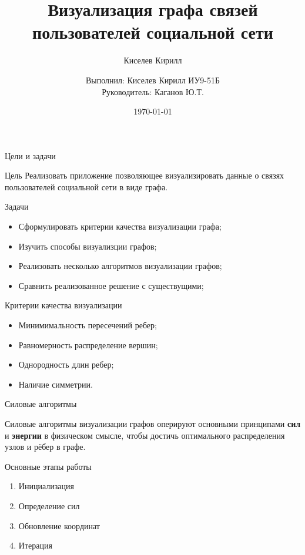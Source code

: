 \documentclass{beamer}
\title{Визуализация графа связей пользователей социальной сети}
\date{\today}
\author{Киселев Кирилл}
\author[me]{Выполнил: Киселев Кирилл ИУ9-51Б\\[1mm]Руководитель: Каганов Ю.Т.}
\begin{document}
\maketitle

\begin{frame}{Цели и задачи}
	\begin{alertblock}{Цель}
		Реализовать приложение позволяющее визуализировать данные о связях пользователей социальной сети в виде графа.
	\end{alertblock}
	\begin{alertblock}{Задачи}

		\begin{itemize}
			\item Сформулировать критерии качества визуализации графа;
			\item Изучить способы визуализции графов;
			\item Реализовать несколько алгоритмов визуализации графов;
			\item Сравнить реализованное решение с существущими;
		\end{itemize}
	\end{alertblock}
\end{frame}

\begin{frame}{Критерии качества визуализации}

	\begin{itemize}
		\item Минимимальность пересечений ребер;
		\item Равномерность распределение вершин;
		\item Однородность длин ребер;
		\item Наличие симметрии.
	\end{itemize}
\end{frame}

\begin{frame}{Силовые алгоритмы}

	\alert{Силовые алгоритмы} визуализации графов оперируют основными принципами \textbf{сил} и \textbf{энергии} в физическом смысле, чтобы достичь оптимального распределения узлов и рёбер в графе.

	\begin{alertblock}{Основные этапы работы}
		\begin{enumerate}
			\item Инициализация
			\item Определение сил
			\item Обновление координат
			\item Итерация
		\end{enumerate}
	\end{alertblock}



\end{frame}
\end{document}
